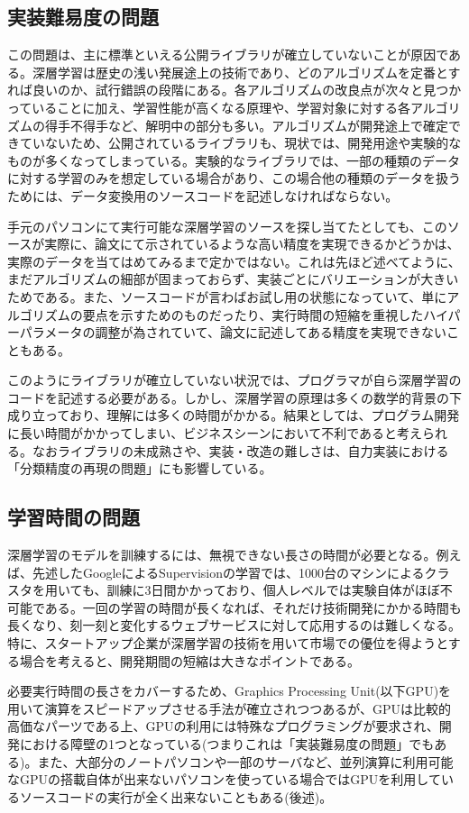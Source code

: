 \subsection{実装難易度の問題}
この問題は、主に標準といえる公開ライブラリが確立していないことが原因である。深層学習は歴史の浅い発展途上の技術であり、どのアルゴリズムを定番とすれば良いのか、試行錯誤の段階にある。各アルゴリズムの改良点が次々と見つかっていることに加え、学習性能が高くなる原理や、学習対象に対する各アルゴリズムの得手不得手など、解明中の部分も多い。アルゴリズムが開発途上で確定できていないため、公開されているライブラリも、現状では、開発用途や実験的なものが多くなってしまっている。実験的なライブラリでは、一部の種類のデータに対する学習のみを想定している場合があり、この場合他の種類のデータを扱うためには、データ変換用のソースコードを記述しなければならない。\par
手元のパソコンにて実行可能な深層学習のソースを探し当てたとしても、このソースが実際に、論文にて示されているような高い精度を実現できるかどうかは、実際のデータを当てはめてみるまで定かではない。これは先ほど述べてように、まだアルゴリズムの細部が固まっておらず、実装ごとにバリエーションが大きいためである。また、ソースコードが言わばお試し用の状態になっていて、単にアルゴリズムの要点を示すためのものだったり、実行時間の短縮を重視したハイパーパラメータの調整が為されていて、論文に記述してある精度を実現できないこともある。\par
このようにライブラリが確立していない状況では、プログラマが自ら深層学習のコードを記述する必要がある。しかし、深層学習の原理は多くの数学的背景の下成り立っており、理解には多くの時間がかかる。結果としては、プログラム開発に長い時間がかかってしまい、ビジネスシーンにおいて不利であると考えられる。なおライブラリの未成熟さや、実装・改造の難しさは、自力実装における「分類精度の再現の問題」にも影響している。\par

\subsection{学習時間の問題}
深層学習のモデルを訓練するには、無視できない長さの時間が必要となる。例えば、先述したGoogleによるSupervisionの学習では、1000台のマシンによるクラスタを用いても、訓練に3日間かかっており、個人レベルでは実験自体がほぼ不可能である\cite{le2012building}。一回の学習の時間が長くなれば、それだけ技術開発にかかる時間も長くなり、刻一刻と変化するウェブサービスに対して応用するのは難しくなる。特に、スタートアップ企業が深層学習の技術を用いて市場での優位を得ようとする場合を考えると、開発期間の短縮は大きなポイントである\cite{ries2011lean}。\par
必要実行時間の長さをカバーするため、Graphics Processing Unit(以下GPU)を用いて演算をスピードアップさせる手法が確立されつつあるが、GPUは比較的高価なパーツである上、GPUの利用には特殊なプログラミングが要求され、開発における障壁の1つとなっている(つまりこれは「実装難易度の問題」でもある)。また、大部分のノートパソコンや一部のサーバなど、並列演算に利用可能なGPUの搭載自体が出来ないパソコンを使っている場合ではGPUを利用しているソースコードの実行が全く出来ないこともある(後述)。\par

